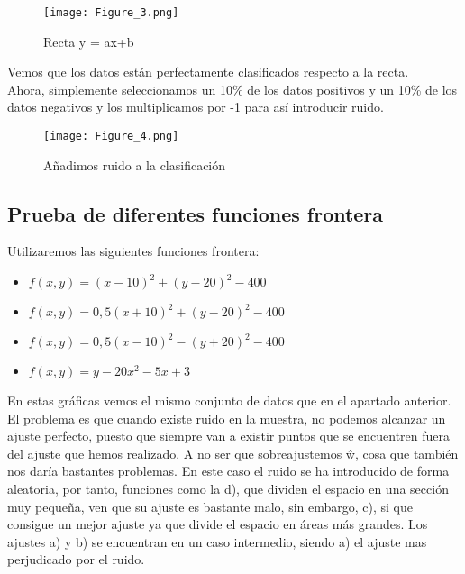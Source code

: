 \begin{figure}[h]
   \centering
   \texttt{[image: Figure\_3.png]}
   \caption{Recta y = ax+b}
\end{figure}

Vemos que los datos están perfectamente clasificados respecto a la recta.\\
Ahora, simplemente seleccionamos un 10\% de los datos positivos y un 10\% de los datos negativos y los multiplicamos por -1 para así introducir ruido.
\begin{figure}[h]
   \centering
   \texttt{[image: Figure\_4.png]}
   \caption{Añadimos ruido a la clasificación}
\end{figure}

\newpage
\subsection{Prueba de diferentes funciones frontera}
Utilizaremos las siguientes funciones frontera:
\begin{itemize}
   \item $ f (x, y) = (x − 10)^{2} + (y − 20)^{2} − 400 $
   \item $ f (x, y) = 0,5(x + 10)^{2} + (y − 20)^{2} − 400 $
   \item $ f (x, y) = 0,5(x − 10)^{2} − (y + 20)^{2} − 400 $
   \item $ f (x, y) = y − 20x^{2} − 5x + 3 $
\end{itemize}

En estas gráficas vemos el mismo conjunto de datos que en el apartado anterior. El problema es que cuando existe ruido en la muestra, no podemos alcanzar un ajuste perfecto, puesto que siempre van a existir puntos que se encuentren fuera del ajuste que hemos realizado. A no ser que sobreajustemos ŵ, cosa que también nos daría bastantes problemas. En este caso el ruido se ha introducido de forma aleatoria, por tanto, funciones como la d), que dividen el espacio en una sección muy pequeña, ven que su ajuste es bastante malo, sin embargo, c), si que consigue un mejor ajuste ya que divide el espacio en áreas más grandes. Los ajustes a) y b) se encuentran en un caso intermedio, siendo a) el ajuste mas perjudicado por el ruido.

